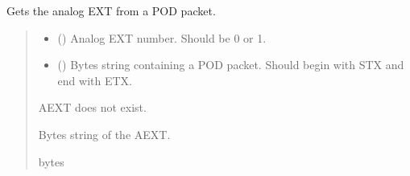 \documentclass[letterpaper,10pt,english]{sphinxmanual}
\begin{document}
\begin{fulllineitems}
\begin{fulllineitems}
\label{\detokenize{Morelia.Packets:Morelia.Packets.Binary5.PacketBinary5.GetAnalogEXT}}
\pysigstartsignatures
{}
\pysigstopsignatures
\sphinxAtStartPar
Gets the analog EXT from a POD packet.
\begin{quote}\begin{description}
\begin{itemize}
\item {} 
\sphinxAtStartPar
{} () \textendash{} Analog EXT number. Should be 0 or 1.

\item {} 
\sphinxAtStartPar
{} () \textendash{} Bytes string containing a POD packet. Should begin with STX and                 end with ETX.

\end{itemize}

\sphinxAtStartPar
{} \textendash{} AEXT does not exist.

\sphinxAtStartPar
Bytes string of the AEXT.

\sphinxAtStartPar
bytes

\end{description}\end{quote}

\end{fulllineitems}



\end{fulllineitems}
\end{document}
